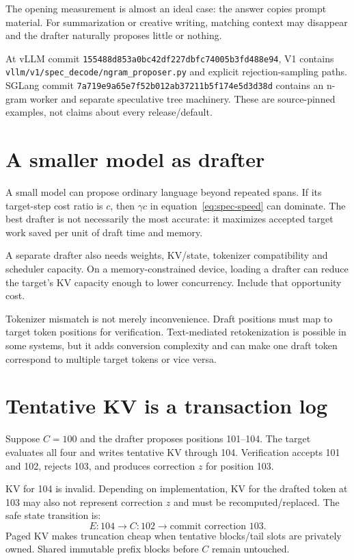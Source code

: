 The opening measurement is almost an ideal case: the answer copies prompt material.
For summarization or creative writing, matching context may disappear and the drafter
naturally proposes little or nothing.

At vLLM commit \texttt{155488d853a0bc42df227dbfc74005b3fd488e94}, V1 contains
\texttt{vllm/v1/spec\_decode/ngram\_proposer.py} and explicit rejection-sampling
paths. SGLang commit \texttt{7a719e9a65e7f52b012ab37211b5f174e5d3d38d}
contains an n-gram worker and separate speculative tree machinery. These are
source-pinned examples, not claims about every release/default.

\section{A smaller model as drafter}

A small model can propose ordinary language beyond repeated spans. If its target-step
cost ratio is $c$, then $\gamma c$ in equation~\eqref{eq:spec-speed} can dominate.
The best drafter is not necessarily the most accurate: it maximizes accepted target
work saved per unit of draft time and memory.

A separate drafter also needs weights, KV/state, tokenizer compatibility and scheduler
capacity. On a memory-constrained device, loading a drafter can reduce the target's KV
capacity enough to lower concurrency. Include that opportunity cost.

Tokenizer mismatch is not merely inconvenience. Draft positions must map to target
token positions for verification. Text-mediated retokenization is possible in some
systems, but it adds conversion complexity and can make one draft token correspond to
multiple target tokens or vice versa.

\section{Tentative KV is a transaction log}

Suppose $C=100$ and the drafter proposes positions 101--104. The target evaluates all
four and writes tentative KV through 104. Verification accepts 101 and 102, rejects
103, and produces correction $z$ for position 103.

KV for 104 is invalid. Depending on implementation, KV for the drafted token at 103
may also not represent correction $z$ and must be recomputed/replaced. The safe state
transition is:
\[
E:104\longrightarrow C:102\longrightarrow \text{commit correction }103.
\]
Paged KV makes truncation cheap when tentative blocks/tail slots are privately owned.
Shared immutable prefix blocks before $C$ remain untouched.

